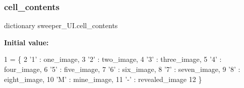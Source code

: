 \subsubsection{\texorpdfstring{cell\+\_\+contents}{cell\_contents}}
{\footnotesize\ttfamily dictionary sweeper\+\_\+\+U\+I.\+cell\+\_\+contents}

{\bfseries Initial value\+:}
\begin{DoxyCode}
1 =  \{
2     \textcolor{stringliteral}{'1'} : one\_image,
3     \textcolor{stringliteral}{'2'} : two\_image,
4     \textcolor{stringliteral}{'3'} : three\_image,
5     \textcolor{stringliteral}{'4'} : four\_image,
6     \textcolor{stringliteral}{'5'} : five\_image,
7     \textcolor{stringliteral}{'6'} : six\_image,
8     \textcolor{stringliteral}{'7'} : seven\_image,
9     \textcolor{stringliteral}{'8'} : eight\_image,
10     \textcolor{stringliteral}{'M'} : mine\_image,
11     \textcolor{stringliteral}{'-'} : revealed\_image
12 \}
\end{DoxyCode}
